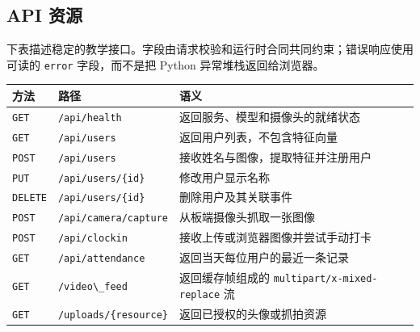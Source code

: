 \subsection{API 资源}\label{api-ux8d44ux6e90}

下表描述稳定的教学接口。字段由请求校验和运行时合同共同约束；错误响应使用
可读的 \passthrough{\lstinline!error!} 字段，而不是把 Python
异常堆栈返回给浏览器。

\begin{longtable}[]{@{}
  >{\raggedright\arraybackslash}p{}
  >{\raggedright\arraybackslash}p{}
  >{\raggedright\arraybackslash}p{}@{}}
\toprule\noalign{}
\begin{minipage}[b]{\linewidth}\raggedright
方法
\end{minipage} & \begin{minipage}[b]{\linewidth}\raggedright
路径
\end{minipage} & \begin{minipage}[b]{\linewidth}\raggedright
语义
\end{minipage} \\
\midrule\noalign{}
\endhead
\bottomrule\noalign{}
\endlastfoot
\passthrough{\lstinline!GET!} & \passthrough{\lstinline!/api/health!} &
返回服务、模型和摄像头的就绪状态 \\
\passthrough{\lstinline!GET!} & \passthrough{\lstinline!/api/users!} &
返回用户列表，不包含特征向量 \\
\passthrough{\lstinline!POST!} & \passthrough{\lstinline!/api/users!} &
接收姓名与图像，提取特征并注册用户 \\
\passthrough{\lstinline!PUT!} &
\passthrough{\lstinline!/api/users/\{id\}!} & 修改用户显示名称 \\
\passthrough{\lstinline!DELETE!} &
\passthrough{\lstinline!/api/users/\{id\}!} & 删除用户及其关联事件 \\
\passthrough{\lstinline!POST!} &
\passthrough{\lstinline!/api/camera/capture!} &
从板端摄像头抓取一张图像 \\
\passthrough{\lstinline!POST!} & \passthrough{\lstinline!/api/clockin!}
& 接收上传或浏览器图像并尝试手动打卡 \\
\passthrough{\lstinline!GET!} &
\passthrough{\lstinline!/api/attendance!} &
返回当天每位用户的最近一条记录 \\
\passthrough{\lstinline!GET!} & \passthrough{\lstinline!/video\_feed!} &
返回缓存帧组成的 \passthrough{\lstinline!multipart/x-mixed-replace!}
流 \\
\passthrough{\lstinline!GET!} &
\passthrough{\lstinline!/uploads/\{resource\}!} &
返回已授权的头像或抓拍资源 \\
\end{longtable}

